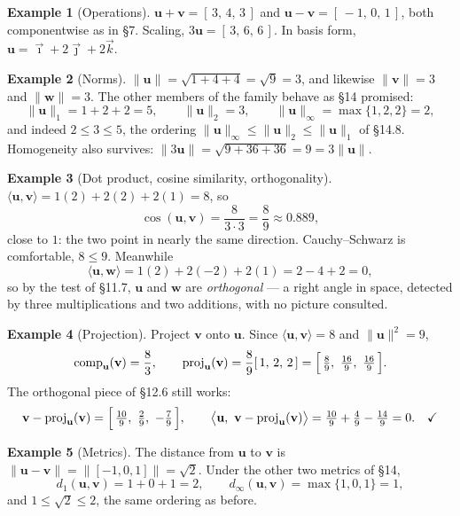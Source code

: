 \documentclass[11pt]{article}
\theoremstyle{definition}
\newtheorem{ex}{Example}[section]
\theoremstyle{remark}
\newcommand{\vc}[1]{\mathbf{#1}}
\newcommand{\norm}[1]{\lVert #1\rVert}
\newcommand{\proj}[2]{\operatorname{proj}_{#1}(#2)}
\newcommand{\comp}[2]{\operatorname{comp}_{#1}(#2)}
\newcommand{\ivec}{\vec{\imath}}
\newcommand{\jvec}{\vec{\jmath}}
\newcommand{\kvec}{\vec{k}}
\begin{document}
\begin{ex}[Operations]
$\vc{u}+\vc{v}=[\,3,\,4,\,3\,]$ and $\vc{u}-\vc{v}=[\,-1,\,0,\,1\,]$, both
componentwise as in \S7. Scaling, $3\vc{u}=[\,3,\,6,\,6\,]$. In basis form,
$\vc{u}=\ivec+2\jvec+2\kvec$.
\end{ex}

\begin{ex}[Norms]
$\norm{\vc{u}}=\sqrt{1+4+4}=\sqrt9=3$, and likewise $\norm{\vc{v}}=3$ and
$\norm{\vc{w}}=3$. The other members of the family behave as \S14 promised:
\[
  \norm{\vc{u}}_1 = 1+2+2 = 5,
  \qquad
  \norm{\vc{u}}_2 = 3,
  \qquad
  \norm{\vc{u}}_\infty = \max\{1,2,2\} = 2 ,
\]
and indeed $2\le3\le5$, the ordering
$\norm{\vc{u}}_\infty\le\norm{\vc{u}}_2\le\norm{\vc{u}}_1$ of \S14.8. Homogeneity
also survives: $\norm{3\vc{u}}=\sqrt{9+36+36}=9=3\norm{\vc{u}}$.
\end{ex}

\begin{ex}[Dot product, cosine similarity, orthogonality]
$\langle\vc{u},\vc{v}\rangle = 1(2)+2(2)+2(1) = 8$, so
\[
  \cos(\vc{u},\vc{v}) = \frac{8}{3\cdot3} = \frac{8}{9}\approx0.889 ,
\]
close to $1$: the two point in nearly the same direction. Cauchy--Schwarz is
comfortable, $8\le9$. Meanwhile
\[
  \langle\vc{u},\vc{w}\rangle = 1(2)+2(-2)+2(1) = 2-4+2 = 0 ,
\]
so by the test of \S11.7, $\vc{u}$ and $\vc{w}$ are \emph{orthogonal} --- a
right angle in space, detected by three multiplications and two additions, with
no picture consulted.
\end{ex}

\begin{ex}[Projection]
Project $\vc{v}$ onto $\vc{u}$. Since $\langle\vc{u},\vc{v}\rangle=8$ and
$\norm{\vc{u}}^{2}=9$,
\[
  \comp{\vc{u}}{\vc{v}} = \frac{8}{3},
  \qquad
  \proj{\vc{u}}{\vc{v}} = \frac{8}{9}[\,1,\,2,\,2\,]
    = \Bigl[\,\tfrac89,\ \tfrac{16}{9},\ \tfrac{16}{9}\,\Bigr] .
\]
The orthogonal piece of \S12.6 still works:
\[
  \vc{v}-\proj{\vc{u}}{\vc{v}}
  = \Bigl[\,\tfrac{10}{9},\ \tfrac{2}{9},\ -\tfrac79\,\Bigr],
  \qquad
  \bigl\langle\vc{u},\ \vc{v}-\proj{\vc{u}}{\vc{v}}\bigr\rangle
  = \tfrac{10}{9}+\tfrac49-\tfrac{14}{9} = 0 . \quad\checkmark
\]
\end{ex}

\begin{ex}[Metrics]
The distance from $\vc{u}$ to $\vc{v}$ is
$\norm{\vc{u}-\vc{v}}=\norm{[-1,0,1]}=\sqrt2$. Under the other two metrics of
\S14,
\[
  d_1(\vc{u},\vc{v}) = 1+0+1 = 2,
  \qquad
  d_\infty(\vc{u},\vc{v}) = \max\{1,0,1\} = 1 ,
\]
and $1\le\sqrt2\le2$, the same ordering as before.
\end{ex}
\end{document}

